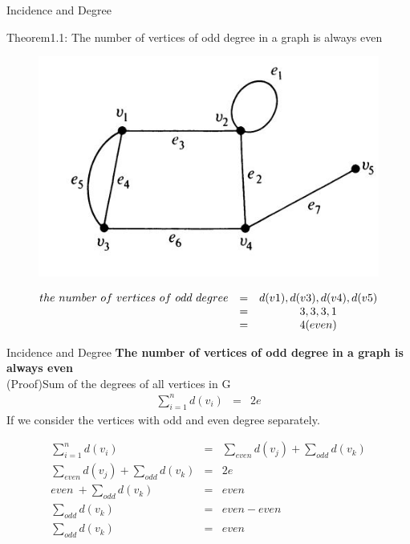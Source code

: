 \documentclass{beamer}
\begin{document}
\begin{frame}{Incidence and Degree}
	\begin{block}{Theorem1.1:}
	The number of vertices of odd degree in a graph is always even
	\end{block}
	\begin{figure}
		\includegraphics[scale=.4]{img/m17}
	\end{figure}
	\begin{equation*}
		\begin{array}{c c c}
			the\ number \ of\  vertices \ of\  odd \ degree &=&d(v1),d(v3),d(v4),d(v5)\\
			&=& 3,3,3,1\\
			&=& 4(even)\\
		\end{array}
	\end{equation*}
\end{frame}
\begin{frame}{Incidence and Degree}
	\textbf{The number of vertices of odd degree in a graph is always even}	\\
(Proof)Sum of the degrees of all vertices in G
	\begin{eqnarray}
	\sum_{i=1}^{n} d(v_i) &=& 2e
		\end{eqnarray}
	If we consider the vertices with odd and even degree separately.
	\begin{small}
		\begin{eqnarray}
		\sum_{i=1}^{n} d(v_i) &=& \sum_{even} d(v_j)+\sum_{odd} d(v_k)\\
		\sum_{even} d(v_j)+\sum_{odd} d(v_k)&=& 2e\\
		even\ +\sum_{odd} d(v_k)&=& even\\
		\sum_{odd} d(v_k)&=& even-even\\
		\sum_{odd} d(v_k)&=& even
	\end{eqnarray}
	\end{small}
\end{frame}
\end{document}
